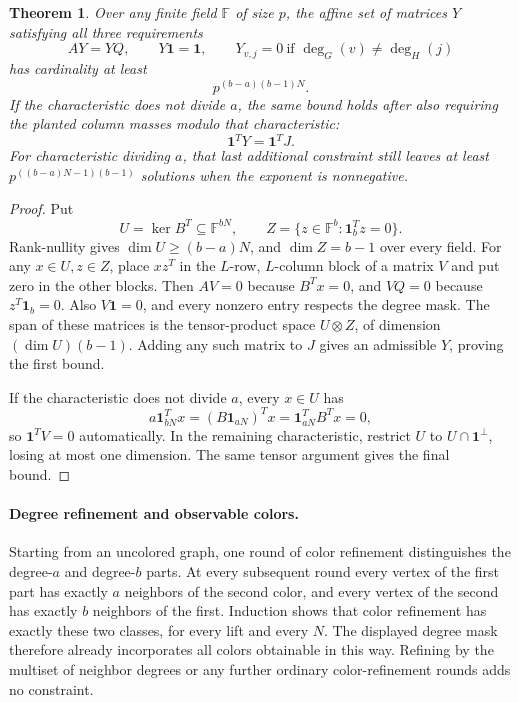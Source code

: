 \documentclass[11pt]{article}
\newtheorem{theorem}{Theorem}
\newcommand{\F}{\mathbb F}
\newcommand{\one}{\mathbf1}
\begin{document}
\begin{theorem}\label{thm:obstruction}
Over any finite field $\F$ of size $p$, the affine set of matrices $Y$
satisfying all three requirements
\[
 AY=YQ,\qquad Y\one=\one,\qquad
 Y_{v,j}=0\ \text{if }\deg_G(v)\ne\deg_H(j)
\]
has cardinality at least
\[
 p^{(b-a)(b-1)N}.
\]
If the characteristic does not divide $a$, the same bound holds after
also requiring the planted column masses modulo that characteristic:
\[
 \one^TY=\one^TJ.
\]
For characteristic dividing $a$, that last additional constraint still
leaves at least $p^{((b-a)N-1)(b-1)}$ solutions when the exponent is
nonnegative.
\end{theorem}
\begin{proof}
Put
\[
 U=\ker B^T\subseteq\F^{bN},\qquad
 Z=\{z\in\F^b:\one_b^Tz=0\}.
\]
Rank-nullity gives $\dim U\ge(b-a)N$, and $\dim Z=b-1$ over every
field. For any $x\in U,z\in Z$, place $xz^T$ in the $L$-row,
$L$-column block of a matrix $V$ and put zero in the other blocks.
Then $AV=0$ because $B^Tx=0$, and $VQ=0$ because $z^T\one_b=0$.
Also $V\one=0$, and every nonzero entry respects the degree mask.
The span of these matrices is the tensor-product space $U\otimes Z$,
of dimension $(\dim U)(b-1)$. Adding any such matrix to $J$ gives an
admissible $Y$, proving the first bound.

If the characteristic does not divide $a$, every $x\in U$ has
\[
 a\one_{bN}^Tx=(B\one_{aN})^Tx
              =\one_{aN}^TB^Tx=0,
\]
so $\one^TV=0$ automatically. In the remaining characteristic,
restrict $U$ to $U\cap\one^\perp$, losing at most one dimension.
The same tensor argument gives the final bound.
\end{proof}

\paragraph{Degree refinement and observable colors.}
Starting from an uncolored graph, one round of color refinement
distinguishes the degree-$a$ and degree-$b$ parts. At every subsequent
round every vertex of the first part has exactly $a$ neighbors of the
second color, and every vertex of the second has exactly $b$ neighbors
of the first. Induction shows that color refinement has exactly these
two classes, for every lift and every $N$. The displayed degree mask
therefore already incorporates all colors obtainable in this way.
Refining by the multiset of neighbor degrees or any further ordinary
color-refinement rounds adds no constraint.
\end{document}
